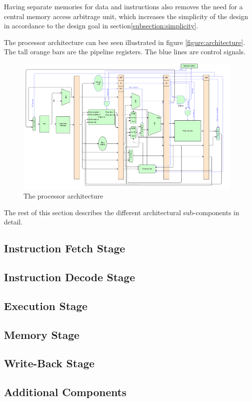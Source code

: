 Having separate memories for data and instructions also removes the need for a central memory access arbitrage unit, which increases the simplicity of the design in accordance to the design goal in section\vref{subsection:simplicity}.

The processor architecture can bee seen illustrated in figure \vref{figure:architecture}.
The tall orange bars are the pipeline registers.
The blue lines are control signals.

\begin{figure}[H]
    \includegraphics[width=\textwidth]{illustrations/processor.pdf}
    \caption{The processor architecture}
    \label{figure:architecture}
\end{figure}

The rest of this section describes the different architectural sub-components in detail.

\subsection{Instruction Fetch Stage}
    

\subsection{Instruction Decode Stage}
    

\subsection{Execution Stage}
    

\subsection{Memory Stage}
    

\subsection{Write-Back Stage}
    

\subsection{Additional Components}
    
